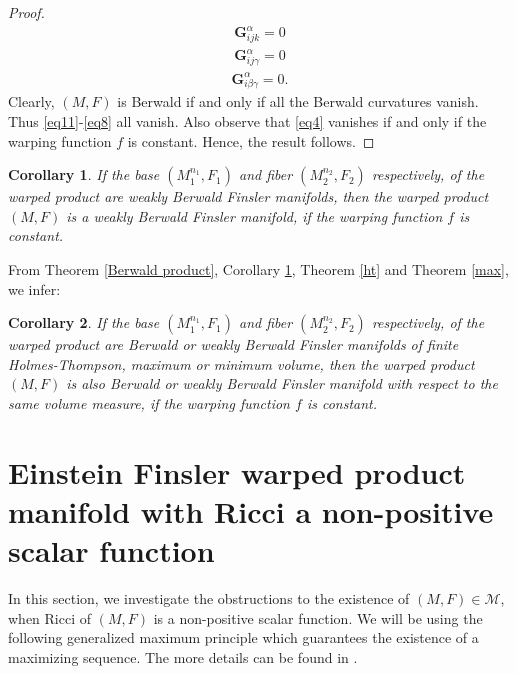 \documentclass[pdflatex,sn-mathphys-num]{sn-jnl}%
\newtheorem{corollary}{Corollary}[section]
\theoremstyle{thmstyleone}%
\theoremstyle{thmstyletwo}%
\theoremstyle{thmstylethree}%
\begin{document}
\begin{proof}
		\begin{align}\label{eq6}
			\mathbf{G}^\alpha_{ijk} =0
		\end{align}
		\begin{align}\label{eq7}
			\mathbf{G}^\alpha_{ij\gamma} =0 
		\end{align}
		\begin{align}\label{eq8}
			\mathbf{G}^\alpha_{i\beta\gamma}=0. 
		\end{align}
		Clearly,  $(M,F)$ is Berwald if and only if  all the Berwald  curvatures 
		vanish. Thus  \eqref{eq11}-\eqref{eq8}
		all vanish. Also observe that 
\eqref{eq4} vanishes if and only if the warping function $f$ is constant.  
 Hence, the result follows.
	\end{proof}
	
	\vspace{0.1in}

 \begin{corollary}\label{weakly}
    If the base $(M_1^{n_1},F_1)$ and fiber $(M_2^{n_2},F_2)$
    respectively, of the warped product are weakly Berwald Finsler manifolds, then the warped product $(M,F)$ is a weakly Berwald Finsler manifold, if the warping function $f$ is constant.
     \end{corollary}

\vspace{0.15in}

From Theorem \ref{Berwald product}, Corollary \ref{weakly}, 
Theorem \ref{ht} and Theorem \ref{max}, we infer:
\vspace{0.15in}


	\begin{corollary}\label{cor4.2}
		If the base $(M_1^{n_1},F_1)$ and fiber $(M_2^{n_2},F_2)$
  respectively, of the warped product are Berwald or weakly Berwald Finsler manifolds of finite Holmes-Thompson, maximum or minimum volume, then the warped product $(M,F)$ is also Berwald or weakly Berwald Finsler manifold with respect to the same volume measure, if the warping function $f$ is constant.
  \end{corollary}


\section{Einstein Finsler warped product manifold with Ricci a non-positive scalar function}\label{sec5}
In this section, we investigate the obstructions to the 
existence of $(M, F) \in \mathcal{M}$, when
Ricci of $(M,F)$ is a non-positive scalar function.
We will be using the following generalized maximum principle
	which guarantees the existence of a maximizing sequence.
	The more details can be found in \cite{PRS}. 
\end{document}
